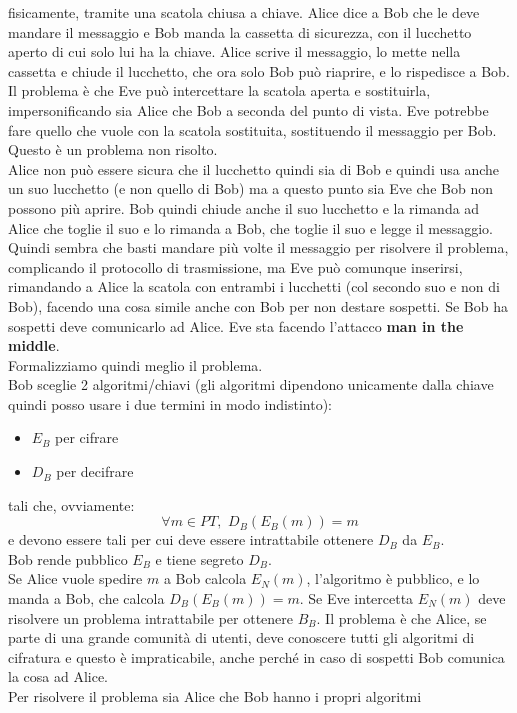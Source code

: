 \documentclass[a4paper,12pt, oneside]{book}
\begin{document}
fisicamente, tramite una scatola chiusa a chiave. Alice dice a Bob che le deve
mandare il messaggio e Bob manda la cassetta di sicurezza, con il lucchetto
aperto di cui solo lui ha la chiave. Alice scrive il messaggio, lo mette nella
cassetta e chiude il lucchetto, che ora solo Bob può riaprire, e lo rispedisce a
Bob. Il problema è che Eve può intercettare la scatola aperta e sostituirla,
impersonificando sia Alice che Bob a seconda del punto di vista. Eve potrebbe
fare quello che vuole con la scatola sostituita, sostituendo il messaggio per
Bob. Questo è un problema non risolto. \\
Alice non può essere sicura che il lucchetto quindi sia di Bob e quindi usa
anche un suo lucchetto (e non quello di Bob) ma a questo punto sia Eve che Bob
non possono più aprire. Bob quindi chiude anche il suo lucchetto e la rimanda ad
Alice che toglie il suo e lo rimanda a Bob, che toglie il suo e legge il
messaggio. Quindi sembra che basti mandare più volte il messaggio per risolvere
il problema, complicando il protocollo di trasmissione, ma Eve può comunque
inserirsi, rimandando a Alice la scatola con entrambi i lucchetti (col secondo
suo e non di Bob), facendo una cosa simile anche con Bob per non destare
sospetti. Se Bob ha sospetti deve comunicarlo ad Alice. Eve sta facendo
l'attacco \textbf{man in the middle}. \\ 
Formalizziamo quindi meglio il problema.\\
Bob sceglie 2 algoritmi/chiavi (gli algoritmi dipendono unicamente dalla chiave
quindi posso usare i due termini in modo indistinto):
\begin{itemize}
  \item $E_B$ per cifrare
  \item $D_B$ per decifrare
\end{itemize}
tali che, ovviamente:
\[\forall m\in PT,\,\,D_B(E_B(m))=m\]
e devono essere tali per cui deve essere intrattabile ottenere $D_B$ da $E_B$.\\
Bob rende pubblico $E_B$ e tiene segreto $D_B$.\\
Se Alice vuole spedire $m$ a Bob calcola $E_N(m)$, l'algoritmo è pubblico, e lo
manda a Bob, che calcola $D_B(E_B(m))=m$. Se Eve intercetta $E_N(m)$ deve
risolvere un problema intrattabile per ottenere $B_B$. Il problema è che Alice,
se parte di una grande comunità di utenti, deve conoscere tutti gli algoritmi di
cifratura e questo è impraticabile, anche perché in caso di sospetti Bob
comunica la cosa ad Alice.\\
Per risolvere il problema sia Alice che Bob hanno i propri algoritmi
\end{document}
